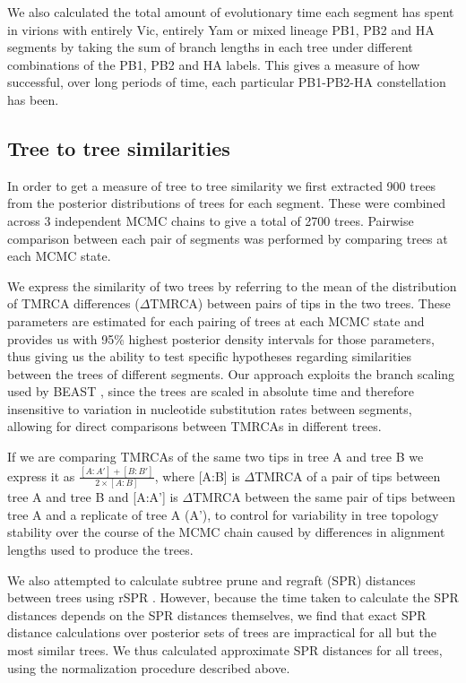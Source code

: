 \documentclass[11pt,oneside,letterpaper]{article}
\begin{document}
We also calculated the total amount of evolutionary time each segment has spent in virions with entirely Vic, entirely Yam or mixed lineage PB1, PB2 and HA segments by taking the sum of branch lengths in each tree under different combinations of the PB1, PB2 and HA labels.
This gives a measure of how successful, over long periods of time, each particular PB1-PB2-HA constellation has been.

\subsection*{Tree to tree similarities}
In order to get a measure of tree to tree similarity we first extracted 900 trees from the posterior distributions of trees for each segment.
These were combined across 3 independent MCMC chains to give a total of 2700 trees.
Pairwise comparison between each pair of segments was performed by comparing trees at each MCMC state.

We express the similarity of two trees by referring to the mean of the distribution of TMRCA differences ($\Delta$TMRCA) between pairs of tips in the two trees.
These parameters are estimated for each pairing of trees at each MCMC state and provides us with 95\% highest posterior density intervals for those parameters, thus giving us the ability to test specific hypotheses regarding similarities between the trees of different segments.
Our approach exploits the branch scaling used by BEAST \cite{drummond2012}, since the trees are scaled in absolute time and therefore insensitive to variation in nucleotide substitution rates between segments, allowing for direct comparisons between TMRCAs in different trees.

If we are comparing TMRCAs of the same two tips in tree A and tree B we express it as $\frac{[A:A']+[B:B']}{2\times [A:B]}$, where [A:B] is $\Delta$TMRCA of a pair of tips between tree A and tree B and [A:A'] is $\Delta$TMRCA between the same pair of tips between tree A and a replicate of tree A (A'), to control for variability in tree topology stability over the course of the MCMC chain caused by differences in alignment lengths used to produce the trees.

We also attempted to calculate subtree prune and regraft (SPR) distances between trees using rSPR \cite{whidden2009,whidden2010,whidden2013}.
However, because the time taken to calculate the SPR distances depends on the SPR distances themselves, we find that exact SPR distance calculations over posterior sets of trees are impractical for all but the most similar trees.
We thus calculated approximate SPR distances for all trees, using the normalization procedure described above.
\end{document}
